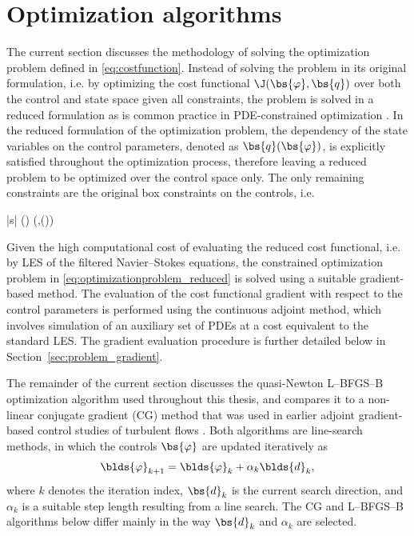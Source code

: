 \section{Optimization algorithms}\label{sec:problem_optimization}

The current section discusses the methodology of solving the optimization problem defined in \eqref{eq:costfunction}. Instead of solving the problem in its original formulation, i.e. by optimizing the cost functional $\J(\bs{\varphi}, \bs{q})$ over both the control and state space given all constraints, the problem is solved in a reduced formulation as is common practice in PDE-constrained optimization \citep{borzinschulz}. In the reduced formulation of the optimization problem, the dependency of the state variables on the control parameters, denoted as $\bs{q}(\bs{\varphi})$, is explicitly satisfied throughout the optimization process, therefore leaving a reduced problem to be optimized over the control space only. The only remaining constraints are the original box constraints on the controls, i.e. 

\begin{mini!}|s|
	{\bs{\varphi}}{\Jtilde(\bs{\varphi}) \equiv \J(\bs{\varphi},(\bs{\varphi}))}{ \label{eq:optimizationproblem_reduced}}{}
\end{mini!}

Given the high computational cost of evaluating the reduced cost functional, i.e. by LES of the filtered Navier--Stokes equations, the constrained optimization problem in \eqref{eq:optimizationproblem_reduced} is solved using a suitable gradient-based method. The evaluation of the cost functional gradient with respect to the control parameters is performed using the continuous adjoint method, which involves simulation of an auxiliary set of PDEs at a cost equivalent to the standard LES. The gradient evaluation procedure is further detailed below in Section~\ref{sec:problem_gradient}. 

The remainder of the current section discusses the quasi-Newton L--BFGS--B optimization algorithm used throughout this thesis, and compares it to a non-linear conjugate gradient (CG) method that was used in earlier adjoint gradient-based control studies of turbulent flows \citep{bewley2001dns, goit2015optimal,goit2016optimal}. Both algorithms are line-search methods, in which the controls $\bs{\varphi}$ are updated iteratively as 
\begin{equation}
	\blds{\varphi}_{k+1} = \blds{\varphi}_k + \alpha_k \blds{d}_k,
\end{equation}
where $k$ denotes the iteration index, $\bs{d}_k$ is the current search direction, and $\alpha_k$ is a suitable step length resulting from a line search. The CG and L--BFGS--B algorithms below differ mainly in the way $\bs{d}_k$ and $\alpha_k$ are selected.

